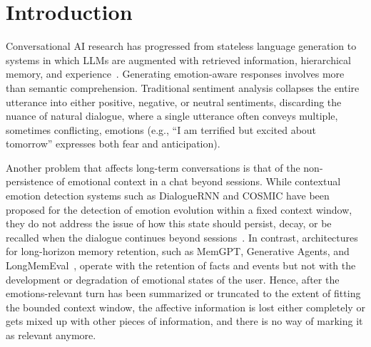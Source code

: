 \documentclass[graybox]{svmult}
\begin{document}



\section{Introduction}
\label{sec:introduction}

Conversational AI research has progressed from stateless language generation to systems in which LLMs are augmented with retrieved information, hierarchical memory, and experience~\cite{lewis2020rag,packer2023memgpt,park2023generative}. Generating emotion-aware responses involves more than semantic comprehension. Traditional sentiment analysis collapses the entire utterance into either positive, negative, or neutral sentiments, discarding the nuance of natural dialogue, where a single utterance often conveys multiple, sometimes conflicting, emotions (e.g., “I am terrified but excited about tomorrow” expresses both fear and anticipation).

Another problem that affects long-term conversations is that of the non-persistence of emotional context in a chat beyond sessions. While contextual emotion detection systems such as DialogueRNN and COSMIC have been proposed for the detection of emotion evolution within a fixed context window, they do not address the issue of how this state should persist, decay, or be recalled when the dialogue continues beyond sessions~\cite{majumder2019dialoguernn,ghosal2020cosmic}. In contrast, architectures for long-horizon memory retention, such as MemGPT, Generative Agents, and LongMemEval~\cite{packer2023memgpt,park2023generative,wu2025longmemeval}, operate with the retention of facts and events but not with the development or degradation of emotional states of the user. Hence, after the emotions-relevant turn has been summarized or truncated to the extent of fitting the bounded context window, the affective information is lost either completely or gets mixed up with other pieces of information, and there is no way of marking it as relevant anymore.
\end{document}

